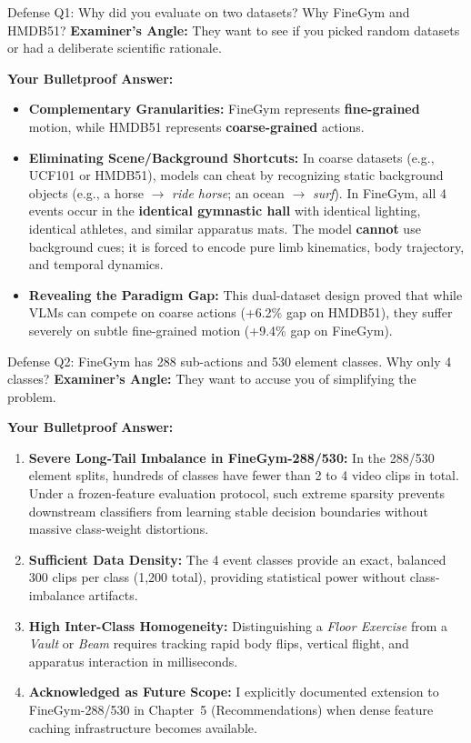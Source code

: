 \documentclass[a4paper, 11pt]{article}
\begin{document}
\begin{defensebox}{Defense Q1: Why did you evaluate on two datasets? Why FineGym and HMDB51?}
\textbf{Examiner's Angle:} They want to see if you picked random datasets or had a deliberate scientific rationale.

\textbf{Your Bulletproof Answer:}
\begin{itemize}
    \item \textbf{Complementary Granularities:} FineGym represents \textbf{fine-grained} motion, while HMDB51 represents \textbf{coarse-grained} actions.
    \item \textbf{Eliminating Scene/Background Shortcuts:} In coarse datasets (e.g., UCF101 or HMDB51), models can cheat by recognizing static background objects (e.g., a horse $\rightarrow$ \textit{ride horse}; an ocean $\rightarrow$ \textit{surf}). In FineGym, all 4 events occur in the \textbf{identical gymnastic hall} with identical lighting, identical athletes, and similar apparatus mats. The model \textbf{cannot} use background cues; it is forced to encode pure limb kinematics, body trajectory, and temporal dynamics.
    \item \textbf{Revealing the Paradigm Gap:} This dual-dataset design proved that while VLMs can compete on coarse actions (+6.2\% gap on HMDB51), they suffer severely on subtle fine-grained motion (+9.4\% gap on FineGym).
\end{itemize}
\end{defensebox}

\begin{defensebox}{Defense Q2: FineGym has 288 sub-actions and 530 element classes. Why only 4 classes?}
\textbf{Examiner's Angle:} They want to accuse you of simplifying the problem.

\textbf{Your Bulletproof Answer:}
\begin{enumerate}
    \item \textbf{Severe Long-Tail Imbalance in FineGym-288/530:} In the 288/530 element splits, hundreds of classes have fewer than 2 to 4 video clips in total. Under a frozen-feature evaluation protocol, such extreme sparsity prevents downstream classifiers from learning stable decision boundaries without massive class-weight distortions.
    \item \textbf{Sufficient Data Density:} The 4 event classes provide an exact, balanced 300 clips per class (1,200 total), providing statistical power without class-imbalance artifacts.
    \item \textbf{High Inter-Class Homogeneity:} Distinguishing a \textit{Floor Exercise} from a \textit{Vault} or \textit{Beam} requires tracking rapid body flips, vertical flight, and apparatus interaction in milliseconds.
    \item \textbf{Acknowledged as Future Scope:} I explicitly documented extension to FineGym-288/530 in Chapter~5 (Recommendations) when dense feature caching infrastructure becomes available.
\end{enumerate}
\end{defensebox}
\end{document}
